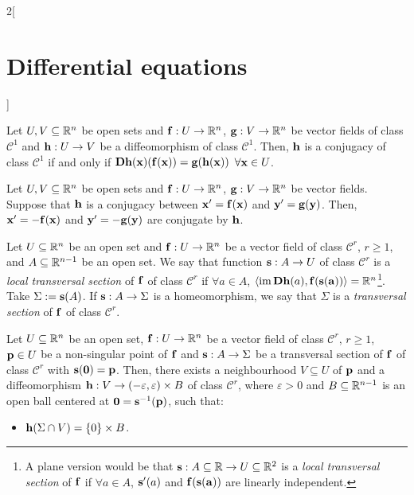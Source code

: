 \documentclass[../../../main_math.tex]{subfiles}
\begin{document}
\begin{multicols}{2}[\section{Differential equations}]
\begin{definition}
  \end{definition}
  \begin{lemma}
    Let $U,V\subseteq \mathbb{R}^n$ be open sets and $\boldsymbol{\mathrm{f}}:U\rightarrow\mathbb{R}^n$, $\boldsymbol{\mathrm{g}}:V\rightarrow\mathbb{R}^n$ be vector fields of class $\mathcal{C}^1$ and $\boldsymbol{\mathrm{h}}:U\rightarrow V$ be a diffeomorphism of class $\mathcal{C}^1$. Then, $\boldsymbol{\mathrm{h}}$ is a conjugacy of class $\mathcal{C}^1$ if and only if $\boldsymbol{\mathrm{Dh}}(\boldsymbol{\mathrm{x}})(\boldsymbol{\mathrm{f}}(\boldsymbol{\mathrm{x}}))=\boldsymbol{\mathrm{g}}(\boldsymbol{\mathrm{h}}(\boldsymbol{\mathrm{x}}))$ $\forall \boldsymbol{\mathrm{x}}\in U$.
  \end{lemma}
  \begin{proposition}
    Let $U,V\subseteq \mathbb{R}^n$ be open sets and $\boldsymbol{\mathrm{f}}:U\rightarrow\mathbb{R}^n$, $\boldsymbol{\mathrm{g}}:V\rightarrow\mathbb{R}^n$ be vector fields. Suppose that $\boldsymbol{\mathrm{h}}$ is a conjugacy between $\boldsymbol{\mathrm{x}}'=\boldsymbol{\mathrm{f}}(\boldsymbol{\mathrm{x}})$ and $\boldsymbol{\mathrm{y}}'=\boldsymbol{\mathrm{g}}(\boldsymbol{\mathrm{y}})$. Then, $\boldsymbol{\mathrm{x}}'=-\boldsymbol{\mathrm{f}}(\boldsymbol{\mathrm{x}})$ and $\boldsymbol{\mathrm{y}}'=-\boldsymbol{\mathrm{g}}(\boldsymbol{\mathrm{y}})$ are conjugate by $\boldsymbol{\mathrm{h}}$.
  \end{proposition}
  \begin{definition}
    Let $U\subseteq\mathbb{R}^n$ be an open set and $\boldsymbol{\mathrm{f}}:U\rightarrow\mathbb{R}^n$ be a vector field of class $\mathcal{C}^r$, $r\geq 1$, and $A\subseteq \mathbb{R}^{n-1}$ be an open set. We say that function $\boldsymbol{\mathrm{s}}:A\rightarrow U$ of class $\mathcal{C}^r$ is a \emph{local transversal section} of $\boldsymbol{\mathrm{f}}$ of class $\mathcal{C}^r$ if $\forall a\in A$, $\langle\operatorname{im} \boldsymbol{\mathrm{Dh}}(a),\boldsymbol{\mathrm{f}}(\boldsymbol{\mathrm{s}}(\boldsymbol{\mathrm{a}}))\rangle=\mathbb{R}^n$\footnote{A plane version would be that $\boldsymbol{\mathrm{s}}:A\subseteq \mathbb{R}\rightarrow U\subseteq \mathbb{R}^2$ is a \emph{local transversal section} of $\boldsymbol{\mathrm{f}}$ if $\forall a\in A$, $\boldsymbol{\mathrm{s}}'(a)$ and $\boldsymbol{\mathrm{f}}(\boldsymbol{\mathrm{s}}(\boldsymbol{\mathrm{a}}))$ are linearly independent.}. Take $\Sigma:=\boldsymbol{\mathrm{s}}(A)$. If $\boldsymbol{\mathrm{s}}:A\rightarrow\Sigma$ is a homeomorphism, we say that $\Sigma$ is a \emph{transversal section} of $\boldsymbol{\mathrm{f}}$ of class $\mathcal{C}^r$.
  \end{definition}
  \begin{theorem}
    Let $U\subseteq \mathbb{R}^n$ be an open set, $\boldsymbol{\mathrm{f}}:U\rightarrow\mathbb{R}^n$ be a vector field of class $\mathcal{C}^r$, $r\geq 1$, $\boldsymbol{\mathrm{p}}\in U$ be a non-singular point of $\boldsymbol{\mathrm{f}}$ and $\boldsymbol{\mathrm{s}}:A\rightarrow\Sigma$ be a transversal section of $\boldsymbol{\mathrm{f}}$ of class $\mathcal{C}^r$ with $\boldsymbol{\mathrm{s}}(\boldsymbol{\mathrm{0}})=\boldsymbol{\mathrm{p}}$. Then, there exists a neighbourhood $V\subseteq U$ of $\boldsymbol{\mathrm{p}}$ and a diffeomorphism $\boldsymbol{\mathrm{h}}:V\rightarrow(-\varepsilon,\varepsilon)\times B$ of class $\mathcal{C}^r$, where $\varepsilon>0$ and $B\subseteq\mathbb{R}^{n-1}$ is an open ball centered at $\boldsymbol{\mathrm{0}}=\boldsymbol{\mathrm{s}}^{-1}(\boldsymbol{\mathrm{p}})$, such that:
    \begin{itemize}
      \item $\boldsymbol{\mathrm{h}}(\Sigma\cap V)=\{0\}\times B$.

\end{itemize}
\end{theorem}
\end{multicols}
\end{document}
